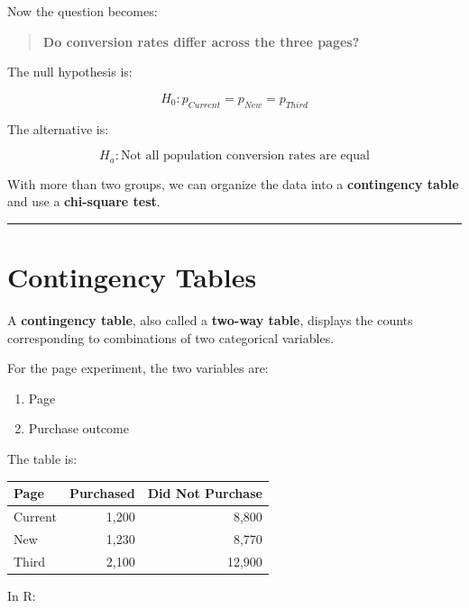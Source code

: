 \documentclass[
  letterpaper,
  DIV=11,
  numbers=noendperiod]{scrreprt}
\newcounter{none} %
\providecommand{\tightlist}{%
  \setlength{\itemsep}{0pt}\setlength{\parskip}{0pt}}
\begin{document}
Now the question becomes:

\begin{quote}
\textbf{Do conversion rates differ across the three pages?}
\end{quote}

The null hypothesis is:

\[
\boxed{
H_0:
p_{Current}
=
p_{New}
=
p_{Third}
}
\]

The alternative is:

\[
\boxed{
H_a:
\text{Not all population conversion rates are equal}
}
\]

With more than two groups, we can organize the data into a
\textbf{contingency table} and use a \textbf{chi-square test}.

\begin{center}\rule{0.5\linewidth}{0.5pt}\end{center}


\chapter{Contingency Tables}\label{contingency-tables}

A \textbf{contingency table}, also called a \textbf{two-way table},
displays the counts corresponding to combinations of two categorical
variables.

For the page experiment, the two variables are:

\begin{enumerate}
\def\labelenumi{\arabic{enumi}.}
\tightlist
\item
  Page
\item
  Purchase outcome
\end{enumerate}

The table is:

{\def\LTcaptype{none} %
\begin{longtable}[]{@{}lrr@{}}
\toprule\noalign{}
Page & Purchased & Did Not Purchase \\
\midrule\noalign{}
\endhead
\bottomrule\noalign{}
\endlastfoot
Current & 1,200 & 8,800 \\
New & 1,230 & 8,770 \\
Third & 2,100 & 12,900 \\
\end{longtable}
}

In R:
\end{document}
